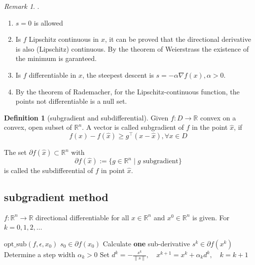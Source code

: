 \documentclass[a4paper,11pt,fleqn, draft]{book}
\theoremstyle{definition}
\newtheorem{definition}{Definition}[section]
\theoremstyle{remark}
\newtheorem*{remark}{Remark}
\begin{document}
\begin{remark}.
	\begin{enumerate}
		\item $s = 0$ is allowed
		\item Is $f$ Lipschitz continuous in $x$, it can be proved that the directional derivative is also (Lipschitz) continuous. By the theorem of Weierstrass the existence of the minimum is garanteed. 
		\item Is $f$ differentiable in $x$, the steepest descent is $s = - \alpha \nabla f(x), \alpha > 0$.
		\item By the theorem of Rademacher, for the Lipschitz-continuous function, the points not differentiable is a null set.
	\end{enumerate}
\end{remark}

\begin{definition}[subgradient and subdifferential]
	Given $f: D \longrightarrow \mathbb{R}$ convex on a convex, open subset of $\mathbb{R}^n$. A vector is called subgradient of $f$ in the point $\hat{x}$, if
	\begin{equation}
		f(x) - f(\hat{x}) \geq g^\top(x-\hat{x}), \forall x \in D
	\end{equation}
	
	The set $\partial f(\hat{x}) \subset \mathbb{R}^n$ with 
	\begin{equation*}
		\partial f(\hat{x}) := \{g \in \mathbb{R}^n \mid g \text{ subgradient}\}
	\end{equation*}
	is called the subdifferential of $f$ in point $\hat{x}$.
\end{definition}

\subsection{subgradient method}
\begin{algorithm}
    \caption{subgradient algorithm}
    $f: \mathbb{R}^n \longrightarrow \mathbb{R}$ directional differentiable for all $x \in \mathbb{R}^n$ and $x^0 \in \mathbb{R}^n$ is given. For $k = 0, 1, 2, \dots$
    \begin{algorithmic}
        \State $\mathrm{opt\_sub} (f, \epsilon , x_0)$
        \State $s_0 \in \partial f(x_0)$
                \State Calculate \textbf{one} sub-derivative $s^k \in \partial f(x^k)$
                \State Determine a step width $\alpha_k > 0$
                \State Set $d^k = -\frac{s^k}{\|s\|},\quad x^{k+1} = x^k + \alpha_k d^k, \quad k = k + 1$
            \EndWhile
    \end{algorithmic}
\end{algorithm}
\end{document}
